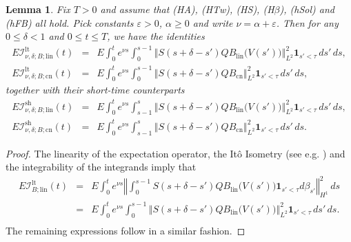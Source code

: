 \documentclass[10pt]{articleHJ}
\newcommand{\e}{\ensuremath{\varepsilon}}
\newcommand{\norm}[1]{\left\Vert#1\right\Vert}		%
\newtheorem{lem}[thm]{Lemma}
\numberwithin{equation}{section}
\begin{document}
\begin{lem}
Fix $T > 0$ and assume that (HA), (HTw), (HS), (H$\beta$),
(hSol) and (hFB) all hold.
Pick constants $\e > 0$,
$\alpha \ge 0$
and write $\nu = \alpha + \e$.
Then for any $0 \le \delta < 1$
and $0 \le t \le T$,
we have the identities
\begin{equation}
\label{eq:nls:ito:isometry:i:lt}
\begin{array}{lcl}
E  \mathcal{I}^{\mathrm{lt}}_{\nu,\delta;B;\mathrm{lin}}(t )
& = &
 E  \int_0^{t}
   e^{ \nu s } \int_{0}^{s-1 }
          \norm{  S(s+\delta-s') Q B_{\mathrm{lin}}\big(V(s')\big) }_{L^2}^2
            \mathbf{1}_{s' < \tau}\, ds' \, ds ,
\\[0.2cm]
%
E \mathcal{I}^{\mathrm{lt}}_{\nu,\delta;B;\mathrm{cn}}(t)
& = &
 E  \int_0^{t}
   e^{ \nu s } \int_{0}^{s-1}
          \norm{  S(s+\delta-s') Q B_{\mathrm{cn}} }_{L^2}^2
          \mathbf{1}_{s' < \tau} \, ds' \, ds ,
\end{array}
\end{equation}
together with their short-time counterparts
\begin{equation}
\label{eq:nls:ito:isometry:i:sh}
\begin{array}{lcl}
E  \mathcal{I}^{\mathrm{sh}}_{\nu,\delta;B;\mathrm{lin}}(t)
& = &
 E  \int_0^{t}
   e^{ \nu s } \int_{s-1  }^{s }
          \norm{  S(s+\delta-s') Q B_{\mathrm{lin}}\big(V(s')\big) }_{L^2}^2
          \mathbf{1}_{s' < \tau} \, ds' \, ds ,
\\[0.2cm]
%
E   \mathcal{I}^{\mathrm{sh}}_{\nu,\delta;B;\mathrm{cn}}(t)
& = &
 E  \int_0^{t}
   e^{ \nu s } \int_{s-1}^s
          \norm{  S(s+\delta-s') Q B_{\mathrm{cn}} }_{L^2}^2
          \mathbf{1}_{s' < \tau} \, ds' \, ds .
\end{array}
\end{equation}
\end{lem}
\begin{proof}
The linearity of the expectation operator,
the It\^o Isometry (see e.g. \cite[\S2.3]{Concise}) and the integrability of the integrands
imply that
\begin{equation}
\begin{array}{lcl}
E \mathcal{I}^{\mathrm{lt}}_{B;\mathrm{lin}}(t )
& = &
  E
   \int_0^{t  }
        e^{\nu s}
        \norm{ \int_0^{s-1}
                   S(s+\delta-s') Q B_{\mathrm{lin}}\big(V(s')\big)
                     \mathbf{1}_{s' < \tau} d \beta_{s'} }_{H^1}^2
                 \, ds
\\[0.2cm]
& = & E   \int_0^{t}  e^{\nu s}
   \int_0^{s-1}
          \norm{
                   S(s+\delta-s') Q B_{\mathrm{lin}}\big(V(s')\big) }_{L^2}^2
                   \mathbf{1}_{s' < \tau} \, ds' \, ds .
\\[0.2cm]
\end{array}
\end{equation}
The remaining expressions follow in a similar fashion.
\end{proof}
\end{document}
